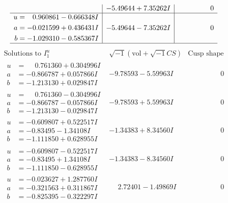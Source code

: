 \documentclass[1p]{elsarticle_modified}
\theoremstyle{definition}
\newcommand{\I}{\sqrt{-1}}
\begin{document}
$$\begin{array}{c|c|c}
 & -5.49644 + 7.35262 I & \phantom{-0.000000 } 0 \\ \hline\begin{aligned}
u &= \phantom{-}0.960861 - 0.666348 I \\
a &= -0.021599 + 0.436431 I \\
b &= -1.029310 - 0.585367 I\end{aligned}
 & -5.49644 - 7.35262 I & \phantom{-0.000000 } 0\\
 \hline 
 \end{array}$$\newpage$$\begin{array}{c|c|c}  
\text{Solutions to }I^u_{1}& \I (\text{vol} + \sqrt{-1}CS) & \text{Cusp shape}\\
 \hline 
\begin{aligned}
u &= \phantom{-}0.761360 + 0.304996 I \\
a &= -0.866787 + 0.057866 I \\
b &= -1.213130 + 0.029847 I\end{aligned}
 & -9.78593 - 5.59963 I & \phantom{-0.000000 } 0 \\ \hline\begin{aligned}
u &= \phantom{-}0.761360 - 0.304996 I \\
a &= -0.866787 - 0.057866 I \\
b &= -1.213130 - 0.029847 I\end{aligned}
 & -9.78593 + 5.59963 I & \phantom{-0.000000 } 0 \\ \hline\begin{aligned}
u &= -0.609807 + 0.522517 I \\
a &= -0.83495 - 1.34108 I \\
b &= -1.111850 + 0.628955 I\end{aligned}
 & -1.34383 + 8.34560 I & \phantom{-0.000000 } 0 \\ \hline\begin{aligned}
u &= -0.609807 - 0.522517 I \\
a &= -0.83495 + 1.34108 I \\
b &= -1.111850 - 0.628955 I\end{aligned}
 & -1.34383 - 8.34560 I & \phantom{-0.000000 } 0 \\ \hline\begin{aligned}
u &= -0.023627 + 1.287760 I \\
a &= -0.321563 + 0.311867 I \\
b &= -0.825395 - 0.322297 I\end{aligned}
 & \phantom{-}2.72401 - 1.49869 I & \phantom{-0.000000 } 0 \\ \hline\begin{aligned}

\end{aligned}
\end{array}$$
\end{document}
